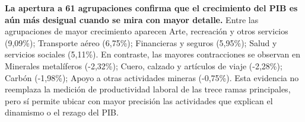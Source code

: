 \textbf{La apertura a 61 agrupaciones confirma que el crecimiento del PIB es aún más desigual cuando se mira con mayor detalle.} Entre las agrupaciones de mayor crecimiento aparecen Arte, recreación y otros servicios (9,09\%); Transporte aéreo (6,75\%); Financieras y seguros (5,95\%); Salud y servicios sociales (5,11\%). En contraste, las mayores contracciones se observan en Minerales metalíferos (-2,32\%); Cuero, calzado y artículos de viaje (-2,28\%); Carbón (-1,98\%); Apoyo a otras actividades mineras (-0,75\%). Esta evidencia no reemplaza la medición de productividad laboral de las trece ramas principales, pero sí permite ubicar con mayor precisión las actividades que explican el dinamismo o el rezago del PIB.
